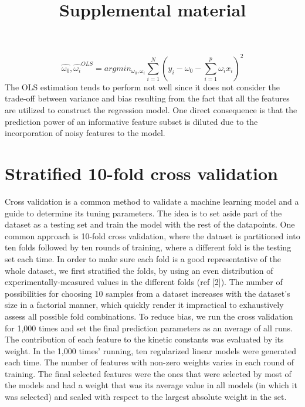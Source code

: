\documentclass[a4paper]{article}
\title{Supplemental material}
\author{}
\date{}
\begin{document}
\maketitle

$$\hat{\omega_0},\hat{\omega_i}^{OLS}=argmin_{{\omega_0},{\omega_i}}{\sum_{i=1}^{N}{(y_i-\omega_0-\sum_{i=1}^{p}\omega_ix_i)}}^2$$
The OLS estimation tends to perform not well since it does not consider the trade-off between variance and bias resulting from the fact that all the features are utilized to construct the regression model. One direct consequence is that the prediction power of an informative feature subset is diluted due to the incorporation of noisy features to the model.

\section{Stratified 10-fold cross validation}
Cross validation is a common method to validate a machine learning model and a guide to determine its tuning parameters. The idea is to set aside part of the dataset as a testing set and train the model with the rest of the datapoints. One common approach is 10-fold cross validation, where the dataset is partitioned into ten folds followed by ten rounds of training, where a different fold is the testing set each time. In order to make sure each fold is a good representative of the whole dataset, we first stratified the folds, by using an even distribution of experimentally-measured values in the different folds (ref [2]).
The number of possibilities for choosing 10 samples from a dataset increases with the dataset's size in a factorial manner, which quickly render it impractical to exhaustively assess all possible fold combinations. To reduce bias, we run the cross validation for 1,000 times and set the final prediction parameters as an average of all runs. The contribution of each feature to the kinetic constants was evaluated by its weight. In the 1,000 times' running, ten regularized linear models were generated each time. The number of features with non-zero weights varies in each round of training. The final selected features were the ones that were selected by most of the models and had a weight that was its average value in all models (in which it was selected) and scaled with respect to the largest absolute weight in the set.
\end{document}

